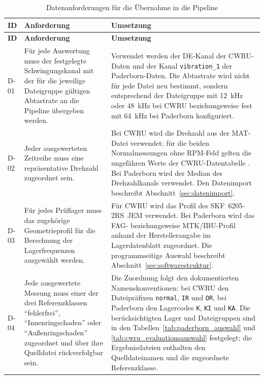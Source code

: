 \begingroup
\small
\setlength{\aboverulesep}{0pt}
\setlength{\belowrulesep}{0pt}
\setlength{\doublerulesep}{0pt}
\renewcommand{\arraystretch}{1.2}
\begin{longtable}{|
    >{\raggedright\arraybackslash}p{1.0cm}|
    >{\raggedright\arraybackslash}p{6.0cm}|
    >{\raggedright\arraybackslash}p{\dimexpr\textwidth-7.0cm-6\tabcolsep-4\arrayrulewidth\relax}|}
  \caption{Datenanforderungen für die Übernahme in die Pipeline}
  \label{tab:anforderungen_daten} \\
    \hline
    \textbf{ID} & \textbf{Anforderung} & \textbf{Umsetzung} \\
    \toprule
    \toprule
    \endfirsthead
    \hline
    \textbf{ID} & \textbf{Anforderung} & \textbf{Umsetzung} \\
    \toprule
    \toprule
    \endhead
    \leavevmode\hypertarget{req:D-01}{D-01} & Für jede Auswertung muss der festgelegte Schwingungskanal mit der
    für die jeweilige Dateigruppe gültigen Abtastrate an die Pipeline
    übergeben werden. &
    Verwendet werden der DE-Kanal der CWRU-Daten und der Kanal
    \texttt{vibration\_1} der Paderborn-Daten. Die Abtastrate wird nicht für
    jede Datei neu bestimmt, sondern entsprechend der Dateigruppe mit 12~kHz
    oder 48~kHz bei CWRU beziehungsweise fest mit 64~kHz bei Paderborn
    konfiguriert. \\
    \hline
    \leavevmode\hypertarget{req:D-02}{D-02} & Jeder ausgewerteten Zeitreihe muss eine repräsentative Drehzahl
    zugeordnet sein. &
    Bei CWRU wird die Drehzahl aus der MAT-Datei verwendet; für die beiden
    Normalmessungen ohne RPM-Feld gelten die ungefähren Werte der
    CWRU-Datentabelle \cite{NormalBaselineData}. Bei Paderborn wird der Median
    des Drehzahlkanals verwendet. Den Datenimport beschreibt
    Abschnitt~\ref{sec:datenimport}. \\
    \hline
    \leavevmode\hypertarget{req:D-03}{D-03} & Für jedes Prüflager muss das zugehörige Geometrieprofil für die
    Berechnung der Lagerfrequenzen ausgewählt werden. &
    Für CWRU wird das Profil des SKF~6205-2RS~JEM verwendet. Bei Paderborn
    wird das FAG- beziehungsweise MTK/IBU-Profil anhand der Herstellerangabe
    im Lagerdatenblatt zugeordnet. Die programmseitige Auswahl beschreibt
    Abschnitt~\ref{sec:softwarestruktur}. \\
    \hline
    \leavevmode\hypertarget{req:D-04}{D-04} & Jede ausgewertete Messung muss einer der drei Referenzklassen
    \enquote{fehlerfrei}, \enquote{Innenringschaden} oder
    \enquote{Außenringschaden} zugeordnet und über ihre Quelldatei
    rückverfolgbar sein. &
    Die Zuordnung folgt den dokumentierten Namenskonventionen: bei CWRU den
    Dateipräfixen \texttt{normal}, \texttt{IR} und \texttt{OR}, bei Paderborn
    den Lagercodes \texttt{K}, \texttt{KI} und \texttt{KA}. Die berücksichtigten
    Lager und Dateigruppen sind in den Tabellen~\ref{tab:paderborn_auswahl} und
    \ref{tab:cwru_evaluationsauswahl} festgelegt; die Ergebnisdateien enthalten
    den Quelldateinamen und die zugeordnete Referenzklasse. \\
    \hline
\end{longtable}
\endgroup

